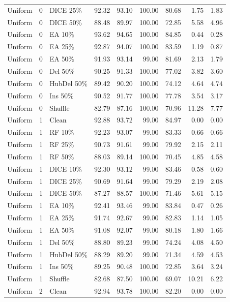 {\begin{longtable}{rllrrrrrr}
Uniform & 0 & DICE 25\% & 92.32 & 93.10 & 100.00 & 80.68 & 1.75 & 1.83 \\
Uniform & 0 & DICE 50\% & 88.48 & 89.97 & 100.00 & 72.85 & 5.58 & 4.96 \\
Uniform & 0 & EA 10\% & 93.62 & 94.65 & 100.00 & 84.85 & 0.44 & 0.28 \\
Uniform & 0 & EA 25\% & 92.87 & 94.07 & 100.00 & 83.59 & 1.19 & 0.87 \\
Uniform & 0 & EA 50\% & 91.93 & 93.14 & 99.00 & 81.69 & 2.13 & 1.79 \\
Uniform & 0 & Del 50\% & 90.25 & 91.33 & 100.00 & 77.02 & 3.82 & 3.60 \\
Uniform & 0 & HubDel 50\% & 89.42 & 90.20 & 100.00 & 74.12 & 4.64 & 4.74 \\
Uniform & 0 & Ins 50\% & 90.52 & 91.77 & 100.00 & 77.78 & 3.54 & 3.17 \\
Uniform & 0 & Shuffle & 82.79 & 87.16 & 100.00 & 70.96 & 11.28 & 7.77 \\
Uniform & 1 & Clean & 92.88 & 93.72 & 99.00 & 84.97 & 0.00 & 0.00 \\
Uniform & 1 & RF 10\% & 92.23 & 93.07 & 99.00 & 83.33 & 0.66 & 0.66 \\
Uniform & 1 & RF 25\% & 90.73 & 91.61 & 99.00 & 79.92 & 2.15 & 2.11 \\
Uniform & 1 & RF 50\% & 88.03 & 89.14 & 100.00 & 70.45 & 4.85 & 4.58 \\
Uniform & 1 & DICE 10\% & 92.30 & 93.12 & 99.00 & 83.46 & 0.58 & 0.60 \\
Uniform & 1 & DICE 25\% & 90.69 & 91.64 & 99.00 & 79.29 & 2.19 & 2.08 \\
Uniform & 1 & DICE 50\% & 87.27 & 88.57 & 100.00 & 71.46 & 5.61 & 5.15 \\
Uniform & 1 & EA 10\% & 92.41 & 93.46 & 99.00 & 83.84 & 0.47 & 0.26 \\
Uniform & 1 & EA 25\% & 91.74 & 92.67 & 99.00 & 82.83 & 1.14 & 1.05 \\
Uniform & 1 & EA 50\% & 91.08 & 92.07 & 99.00 & 80.18 & 1.80 & 1.66 \\
Uniform & 1 & Del 50\% & 88.80 & 89.23 & 99.00 & 74.24 & 4.08 & 4.50 \\
Uniform & 1 & HubDel 50\% & 88.29 & 89.20 & 99.00 & 71.34 & 4.59 & 4.53 \\
Uniform & 1 & Ins 50\% & 89.25 & 90.48 & 100.00 & 72.85 & 3.64 & 3.24 \\
Uniform & 1 & Shuffle & 82.68 & 87.50 & 100.00 & 69.07 & 10.21 & 6.22 \\
Uniform & 2 & Clean & 92.94 & 93.78 & 100.00 & 82.20 & 0.00 & 0.00 \\

\end{longtable}}

